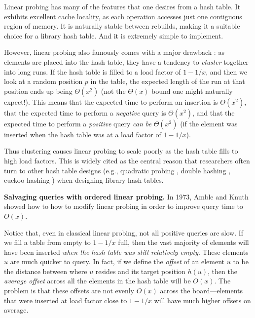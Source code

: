 \documentclass[10pt]{article}
\theoremstyle{remark}
\theoremstyle{remark}
\renewcommand{\paragraph}[1]{\vspace{.2 cm} \noindent \textbf{#1}}
\begin{document}
Linear probing has many of the features that one desires from a hash table. It exhibits excellent cache locality, as each operation accesses just one contiguous region of memory. It is naturally stable between rebuilds, making it a suitable choice for a library hash table. And it is extremely simple to implement.

However, linear probing also famously comes with a major drawback \cite{...}: as elements are placed into the hash table, they have a tendency to \emph{cluster} together into long runs. If the hash table is filled to a load factor of $1 - 1/x$, and then we look at a random position $p$ in the table, the expected length of the run at that position ends up being $\Theta(x^2)$ (not the $\Theta(x)$ bound one might naturally expect!). This means that the expected time to perform an insertion is $\Theta(x^2)$, that the expected time to perform a \emph{negative} query is $\Theta(x^2)$, and that the expected time to perform a \emph{positive} query \emph{can be} $\Theta(x^2)$ (if the element was inserted when the hash table was at a load factor of $1 - 1/x$).

Thus clustering causes linear probing to scale poorly as the hash table fills to high load factors. This is widely cited as the central reason that researchers often turn to other hash table designs (e.g., quadratic probing \cite{...}, double hashing \cite{...}, cuckoo hashing \cite{...}) when designing library hash tables.

\paragraph{Salvaging queries with ordered linear probing.} In 1973, Amble and Knuth \cite{AmbleKn74} showed how to how to modify linear probing in order to improve query time to $O(x)$. 

Notice that, even in classical linear probing, not all positive queries are slow. If we fill a table from empty to $1 - 1/x$ full, then the vast majority of elements will have been inserted \emph{when the hash table was still relatively empty}. These elements $u$ are much quicker to query. In fact, if we define the \emph{offset} of an element $u$ to be the distance between where $u$ resides and its target position $h(u)$, then the \emph{average offset} across all the elements in the hash table will be $O(x)$. The problem is that these offsets are not evenly $O(x)$ across the board---elements that were inserted at load factor close to $1 - 1/x$ will have much higher offsets on average. 
\end{document}
